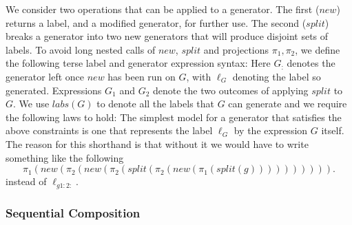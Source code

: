 We consider two operations that can be applied to a generator.
The first ($new$) returns a label, and a modified generator,
for further use.
The second ($split$) breaks a generator into two new generators
that will produce disjoint sets of labels.
To avoid long nested calls of $new$, $split$ and projections $\pi_1,\pi_2$,
we define the following terse label and generator expression syntax:
Here $G_{:}$ denotes the generator left once $new$ has been run on $G$,
with $\ell_G$ denoting the label so generated.
Expressions $G_1$ and $G_2$ denote the two outcomes of applying $split$ to $G$.
We use $labs(G)$ to denote all the labels that $G$ can generate
and we require the following laws to hold:
The simplest model for a generator that satisfies the above constraints
is one that represents the label $\ell_G$ by the expression $G$ itself.
The reason for this shorthand is that without it we would have to write
something like the following
\begin{equation*}
\pi_1(new(\pi_2(new(\pi_2(split(\pi_2(new(\pi_1(split(g)))))))))).
\end{equation*}
instead of $\ell_{g1:2:}$.



\subsubsection{Sequential Composition}





